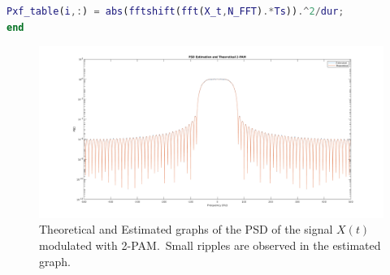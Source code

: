 \documentclass[12pt, a4paper]{article}
\begin{document}
\begin{enumerate}
\begin{enumerate}
\begin{lstlisting}[language=MATLAB]
Pxf_table(i,:) = abs(fftshift(fft(X_t,N_FFT).*Ts)).^2/dur;
end
        \end{lstlisting}
        \begin{figure}[H]
            \centering
            \noindent\includegraphics[width=\textwidth]{PSD_EST_THE_2PAM.png}
            \caption{Theoretical and Estimated graphs of the PSD of the signal \(X(t)\) modulated with 2-PAM.\ 
            Small ripples are observed in the estimated graph.}
        \end{figure}


\end{enumerate}
\end{enumerate}
\end{document}
